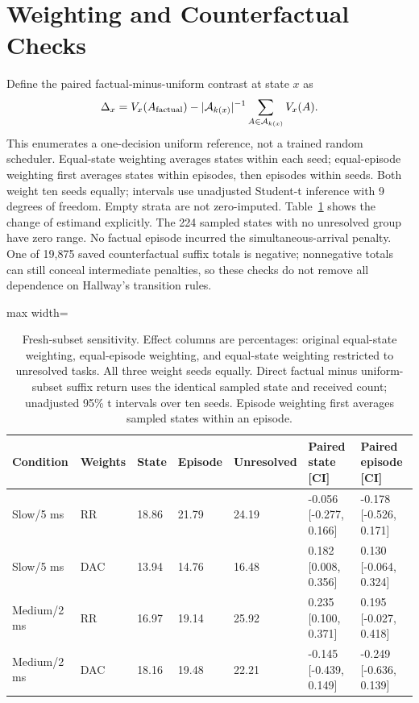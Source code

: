 \documentclass[10pt]{article}
\begin{document}
\section{Weighting and Counterfactual Checks}\label{app:robustness}
Define the paired factual-minus-uniform contrast at state $x$ as
\[
\Delta_x=V_x(A_{\rm factual})-|\mathcal A_{k(x)}|^{-1}\sum_{A\in\mathcal A_{k(x)}}V_x(A).
\]
This enumerates a one-decision uniform reference, not a trained random scheduler. Equal-state weighting averages states within each seed; equal-episode weighting first averages states within episodes, then episodes within seeds. Both weight ten seeds equally; intervals use unadjusted Student-t inference with 9 degrees of freedom. Empty strata are not zero-imputed. Table~\ref{tab:robust_strata} shows the change of estimand explicitly. The 224 sampled states with no unresolved group have zero range. No factual episode incurred the simultaneous-arrival penalty. One of 19,875 saved counterfactual suffix totals is negative; nonnegative totals can still conceal intermediate penalties, so these checks do not remove all dependence on Hallway's transition rules.

\begin{table}[htbp]\centering\setlength{\tabcolsep}{3pt}\footnotesize
\caption{Fresh-subset sensitivity. Effect columns are percentages: original equal-state weighting, equal-episode weighting, and equal-state weighting restricted to unresolved tasks. All three weight seeds equally. Direct factual minus uniform-subset suffix return uses the identical sampled state and received count; unadjusted 95\% t intervals over ten seeds. Episode weighting first averages sampled states within an episode.}\label{tab:robust_strata}
\begin{adjustbox}{max width=\linewidth}\begin{tabular}{lllllll}\toprule
Condition & Weights & State & Episode & Unresolved & Paired state [CI] & Paired episode [CI]\\\midrule
Slow/5 ms & RR & 18.86 & 21.79 & 24.19 & -0.056 [-0.277, 0.166] & -0.178 [-0.526, 0.171]\\
Slow/5 ms & DAC & 13.94 & 14.76 & 16.48 & 0.182 [0.008, 0.356] & 0.130 [-0.064, 0.324]\\
Medium/2 ms & RR & 16.97 & 19.14 & 25.92 & 0.235 [0.100, 0.371] & 0.195 [-0.027, 0.418]\\
Medium/2 ms & DAC & 18.16 & 19.48 & 22.21 & -0.145 [-0.439, 0.149] & -0.249 [-0.636, 0.139]\\
\bottomrule\end{tabular}\end{adjustbox}\end{table}
\end{document}
